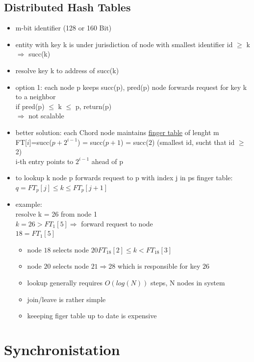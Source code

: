 \documentclass[ngerman,a4paper]{report}
\begin{document}
\subsection{Distributed Hash Tables}
\begin{itemize}
\item m-bit identifier (128 or 160 Bit)
\item entity with key k is under jurisdiction of node with smallest identifier id $\geq$ k\\
$\Rightarrow$ succ(k)
\item resolve key k to address of succ(k)
\item option 1: each node p keeps succ(p), pred(p) node forwards request for key k to a neighbor\\
if pred(p) $\leq$ k $\leq$ p, return(p)\\
$\Rightarrow$ not scalable
\item better solution: each Chord node maintains
\underline{finger table} of lenght m\\
FT[$i$]=succ($p+2^{i-1}$) = succ($p+1$) = succ($2$) (smallest id, sucht that id $\geq$ 2)\\
i-th entry points to $2^{i-1}$ ahead of p
\item to lookup k node p forwards request to p with index j in ps finger table:\\
$q = FT_p[j] \leq k \leq FT_p[j+1]$
\item example:\\
resolve k = 26 from node 1 \\
$k=26 > FT_1[5] \Rightarrow$ forward request to node\\
$18 = FT_1[5]$
\begin{itemize}
\item node $18$ selects node $20 FT_{18}[2] \leq k < FT_{18}[3]$\\
\item node $20$ selects node $21 \Rightarrow 28 $ which is responsible for key $26$\\
\item lookup generally requires $O(log(N))$ steps, N nodes in system
\item join/leave is rather simple
\item keeeping figer table up to date is expensive
\end{itemize} 
\end{itemize}
\section{Synchronistation}
\end{document}
